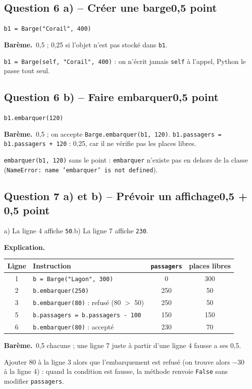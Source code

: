 \documentclass[11pt, a4paper]{exam}
\newcommand{\code}[1]{\texttt{#1}}
\newcommand{\Qt}[2]{\par\needspace{10\baselineskip}\subsection*{#1\hfill{\normalfont\small #2}}}
\newcommand{\bareme}[1]{\par\noindent\textbf{Barème.}\ #1\par\smallskip}
\newcommand{\explication}{\noindent\textbf{Explication.}\ }
\begin{document}
\Qt{Question 6 a) -- Créer une barge}{0,5 point}
\begin{reponse}
\code{b1 = Barge("Corail", 400)}
\end{reponse}
\bareme{0,5 ; 0,25 si l'objet n'est pas stocké dans \code{b1}.}
\begin{erreur}
\code{b1 = Barge(self, "Corail", 400)} : on n'écrit jamais \code{self} à l'appel, Python le passe tout seul.
\end{erreur}

\Qt{Question 6 b) -- Faire embarquer}{0,5 point}
\begin{reponse}
\code{b1.embarquer(120)}
\end{reponse}
\bareme{0,5 ; on accepte \code{Barge.embarquer(b1, 120)}. \code{b1.passagers = b1.passagers + 120} : 0,25, car il ne vérifie pas les places libres.}
\begin{erreur}
\code{embarquer(b1, 120)} sans le point : \code{embarquer} n'existe pas en dehors de la classe (\code{NameError: name 'embarquer' is not defined}).
\end{erreur}

\Qt{Question 7 a) et b) -- Prévoir un affichage}{0,5 + 0,5 point}
\begin{reponse}
a) La ligne 4 affiche \code{50}.\qquad b) La ligne 7 affiche \code{230}.
\end{reponse}
\explication
\begin{center}\small
\begin{tabular}{|c|l|c|c|}\hline
Ligne & Instruction & \code{passagers} & places libres \\\hline
1 & \code{b = Barge("Lagon", 300)} & 0 & 300 \\\hline
2 & \code{b.embarquer(250)} & 250 & 50 \\\hline
3 & \code{b.embarquer(80)} : refusé (80 $>$ 50) & 250 & 50 \\\hline
5 & \code{b.passagers = b.passagers - 100} & 150 & 150 \\\hline
6 & \code{b.embarquer(80)} : accepté & 230 & 70 \\\hline
\end{tabular}
\end{center}
\bareme{0,5 chacune ; une ligne 7 juste à partir d'une ligne 4 fausse a ses 0,5.}
\begin{erreur}
Ajouter 80 à la ligne 3 alors que l'embarquement est refusé (on trouve alors $-30$ à la ligne 4) : quand la condition est fausse, la méthode renvoie \code{False} sans modifier \code{passagers}.
\end{erreur}
\end{document}
